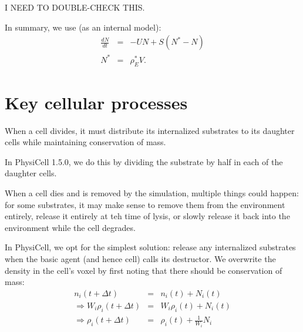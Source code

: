 \documentclass[11point]{article}
\newcommand{\beq}{\begin{eqnarray}}
\newcommand{\eeq}{\end{eqnarray}}
\begin{document}
I NEED TO DOUBLE-CHECK THIS. 

In summary, we use (as an internal model): 
\beq
\frac{dN}{dt} & = & 
- UN + S \left( N^* - N \right) \\
N^* & = & \rho_E^* V. 
\eeq


\section{Key cellular processes}
When a cell divides, it must distribute its internalized substrates to its daughter cells while maintaining conservation of mass. 

In PhysiCell 1.5.0, we do this by dividing the substrate by half in each of the daughter cells. 

When a cell dies and is removed by the simulation, multiple things could happen: for some substrates, it may make sense to 
remove them from the environment entirely, release it entirely at teh time of lysis, or slowly release it back into the environment 
while the cell degrades. 

In PhysiCell, we opt for the simplest solution: release any internalized substrates when the basic agent (and hence cell) calls 
its destructor. We overwrite the density in the cell's voxel by first noting that there should be conservation of mass: 
\beq
n_i( t + \Delta t ) & = & 
n_i( t ) + N_i (t)  \\ 
\Longrightarrow 
W_i \rho_i(t + \Delta t) & = &
W_i \rho_i(t) + N_i(t) \\ 
\Longrightarrow 
\rho_i( t + \Delta t ) & = & 
\rho_i(t) + \frac{1}{W_i} N_i 
\eeq
\end{document}
